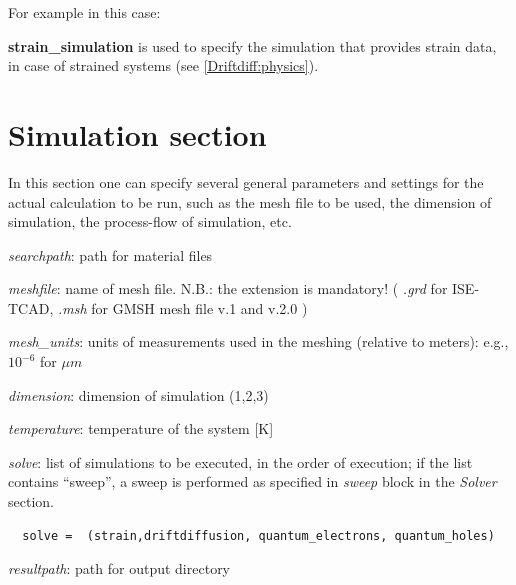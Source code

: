 For example in this case:

\textbf{strain\_simulation}  is  used to specify the  simulation that  provides  strain data, in  case  of  strained systems (see \ref{Driftdiff:physics}).


% 
% 
% 
% 



\section{Simulation section }
\label{input:simulation}

In this  section one  can  specify  several general parameters and settings  for  the  actual  calculation to be  run, such as the mesh file to be  used, the dimension of  simulation, the process-flow of  simulation, etc.

\textit{searchpath}:  path for  material  files \label{matfiles}

\textit{meshfile}: name of  mesh file. N.B.: the extension is mandatory! ( \textit{.grd} for ISE-TCAD, \textit{.msh} for GMSH mesh file v.1 and v.2.0 )

\textit{mesh\_units}: units of  measurements used in the  meshing (relative to meters): e.g., $10^{-6}$ for  $\mu m$

\textit{dimension}:  dimension of  simulation (1,2,3)

\textit{temperature}:  temperature  of the system [K]

\textit{solve}: list of  simulations to  be  executed, in the order of  execution; if the list   contains "`sweep"', a sweep is  performed as specified in \textit{sweep} block in the  \textit{Solver} section.   

\begin{verbatim}
  solve =  (strain,driftdiffusion, quantum_electrons, quantum_holes)
\end{verbatim}



\textit{resultpath}:  path for output  directory 

